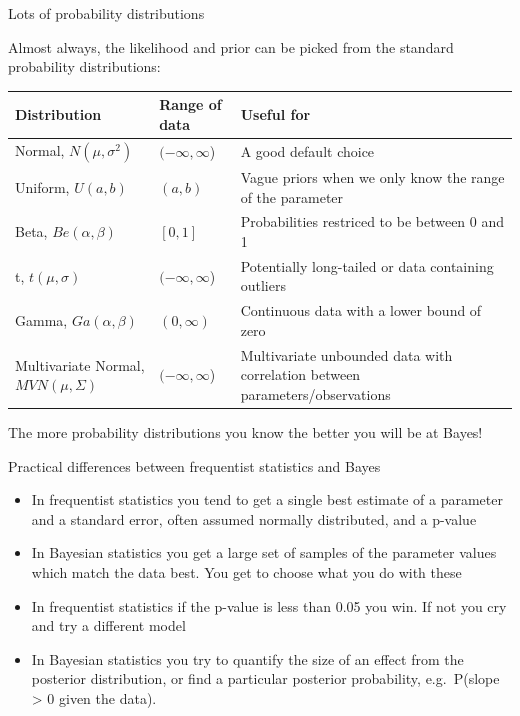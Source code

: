 \documentclass[ignorenonframetext,]{beamer}
\providecommand{\tightlist}{%
  \setlength{\itemsep}{0pt}\setlength{\parskip}{0pt}}
\begin{document}
\begin{frame}{Lots of probability distributions}

Almost always, the likelihood and prior can be picked from the standard
probability distributions:

\tiny

\begin{tabular}{p{3cm}lp{4cm}}
\hline
Distribution & Range of data & Useful for \\
\hline
Normal, $N(\mu,\sigma^2)$ & $(-\infty,\infty$) & A good default choice \\
Uniform, $U(a,b)$ & $(a,b)$ & Vague priors when we only know the range of the parameter \\
Beta, $Be(\alpha,\beta)$ & $[0,1]$ & Probabilities restriced to be between 0 and 1 \\
t, $t(\mu, \sigma)$ & $(-\infty,\infty$) & Potentially long-tailed or data containing outliers \\
Gamma, $Ga(\alpha,\beta)$ & $(0,\infty)$ & Continuous data with a lower bound of zero \\
Multivariate Normal, $MVN(\mu,\Sigma)$ & $(-\infty,\infty$) & Multivariate unbounded data with correlation between parameters/observations \\
\hline
\end{tabular}

\normalsize
The more probability distributions you know the better you will be at
Bayes!

\end{frame}

\begin{frame}{Practical differences between frequentist statistics and
Bayes}

\begin{itemize}
\tightlist
\item
  In frequentist statistics you tend to get a single best estimate of a
  parameter and a standard error, often assumed normally distributed,
  and a p-value
\item
  In Bayesian statistics you get a large set of samples of the parameter
  values which match the data best. You get to choose what you do with
  these
\item
  In frequentist statistics if the p-value is less than 0.05 you win. If
  not you cry and try a different model
\item
  In Bayesian statistics you try to quantify the size of an effect from
  the posterior distribution, or find a particular posterior
  probability, e.g.~P(slope \textgreater{} 0 given the data).
\end{itemize}

\end{frame}
\end{document}

